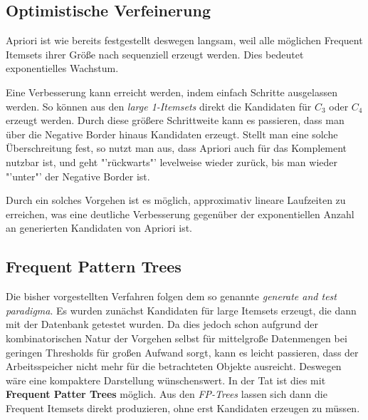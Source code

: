 \subsection{Optimistische Verfeinerung}
Apriori ist wie bereits festgestellt deswegen langsam, weil alle möglichen Frequent
Itemsets ihrer Größe nach sequenziell erzeugt werden. Dies bedeutet exponentielles
Wachstum.

Eine Verbesserung kann erreicht werden, indem einfach Schritte ausgelassen werden.
So können aus den \textit{large 1-Itemsets} direkt die Kandidaten für \(C_3\) oder
\(C_4\) erzeugt werden. Durch diese größere Schrittweite kann es passieren, dass man
über die Negative Border hinaus Kandidaten erzeugt. Stellt man eine solche Überschreitung
fest, so nutzt man aus, dass Apriori auch für das Komplement nutzbar ist, und geht
"'rückwarts"' levelweise wieder zurück, bis man wieder "'unter"' der Negative Border ist.

Durch ein solches Vorgehen ist es möglich, approximativ lineare Laufzeiten zu erreichen, 
was eine deutliche Verbesserung gegenüber der exponentiellen Anzahl an generierten Kandidaten
von Apriori ist.

\subsection{Frequent Pattern Trees}
Die bisher vorgestellten Verfahren folgen dem so genannte \textit{generate and test
paradigma}. Es wurden zunächst Kandidaten für large Itemsets erzeugt, die dann 
mit der Datenbank getestet wurden. Da dies jedoch schon aufgrund der kombinatorischen
Natur der Vorgehen selbst für mittelgroße Datenmengen bei geringen Thresholds für
großen Aufwand sorgt, kann es leicht passieren, dass der Arbeitsspeicher nicht
mehr für die betrachteten Objekte ausreicht. Deswegen wäre eine kompaktere Darstellung
wünschenswert. In der Tat ist dies mit \textbf{Frequent Patter Trees} möglich.
Aus den \textit{FP-Trees} lassen sich dann die Frequent Itemsets direkt produzieren,
ohne erst Kandidaten erzeugen zu müssen.

